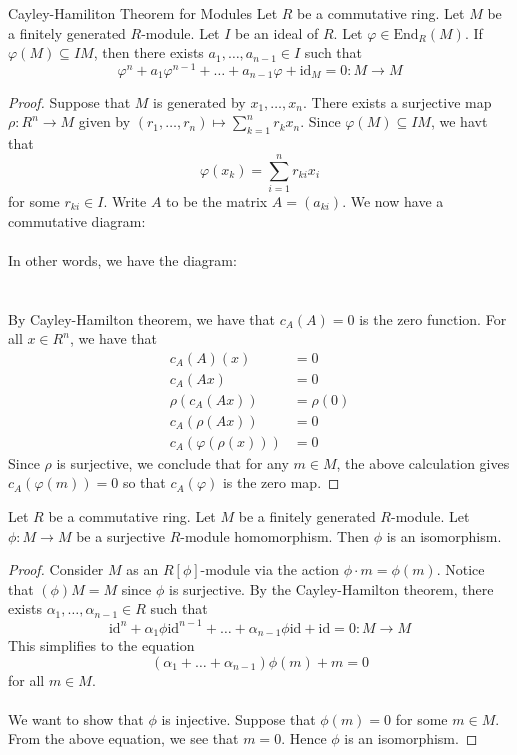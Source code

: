 \documentclass[a4paper]{article}
\begin{document}
\begin{thm}{Cayley-Hamiliton Theorem for Modules}{} Let $R$ be a commutative ring. Let $M$ be a finitely generated $R$-module. Let $I$ be an ideal of $R$. Let $\varphi\in\text{End}_R(M)$. If $\varphi(M)\subseteq IM$, then there exists $a_1,\dots,a_{n-1}\in I$ such that $$\varphi^n+a_1\varphi^{n-1}+\dots+a_{n-1}\varphi+\text{id}_M=0:M\to M$$ \tcbline
\begin{proof}
Suppose that $M$ is generated by $x_1,\dots,x_n$. There exists a surjective map $\rho:R^n\to M$ given by $(r_1,\dots,r_n)\mapsto\sum_{k=1}^nr_kx_n$. Since $\varphi(M)\subseteq IM$, we havt that $$\varphi(x_k)=\sum_{i=1}^nr_{ki}x_i$$ for some $r_{ki}\in I$. Write $A$ to be the matrix $A=(a_{ki})$. We now have a commutative diagram: \\~\\
In other words, we have the diagram: \\
\\~\\
By Cayley-Hamilton theorem, we have that $c_A(A)=0$ is the zero function. For all $x\in R^n$, we have that 
\begin{align*}
c_A(A)(x)&=0\\
c_A(Ax)&=0\\
\rho(c_A(Ax))&=\rho(0)\\
c_A(\rho(Ax))&=0\tag{$\rho$ is $R$-linear}\\
c_A(\varphi(\rho(x)))&=0\tag{Diagram is commutative}
\end{align*}
Since $\rho$ is surjective, we conclude that for any $m\in M$, the above calculation gives $c_A(\varphi(m))=0$ so that $c_A(\varphi)$ is the zero map. 
\end{proof}
\end{thm}

\begin{prp}{}{} Let $R$ be a commutative ring. Let $M$ be a finitely generated $R$-module. Let $\phi:M\to M$ be a surjective $R$-module homomorphism. Then $\phi$ is an isomorphism. \tcbline
\begin{proof}
Consider $M$ as an $R[\phi]$-module via the action $\phi\cdot m=\phi(m)$. Notice that $(\phi)M=M$ since $\phi$ is surjective. By the Cayley-Hamilton theorem, there exists $\alpha_1,\dots,\alpha_{n-1}\in R$ such that $$\text{id}^n+\alpha_1\phi\text{id}^{n-1}+\dots+\alpha_{n-1}\phi\text{id}+\text{id}=0:M\to M$$ This simplifies to the equation $$(\alpha_1+\dots+\alpha_{n-1})\phi(m)+m=0$$ for all $m\in M$. \\~\\

We want to show that $\phi$ is injective. Suppose that $\phi(m)=0$ for some $m\in M$. From the above equation, we see that $m=0$. Hence $\phi$ is an isomorphism. 
\end{proof}
\end{prp}
\end{document}
